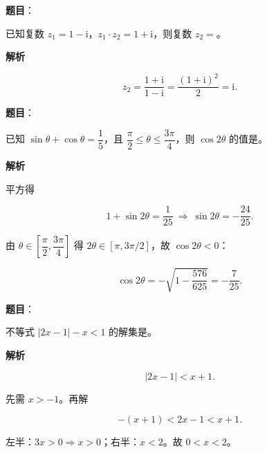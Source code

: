 \begin{answer}

\textbf{题目}：

已知复数 $z_1=1-\mathrm i$，$z_1\cdot z_2=1+\mathrm i$，则复数 $z_2=$\gkblank{}。

\textbf{解析}

\nopagebreak[4]
\[z_2=\frac{1+\mathrm i}{1-\mathrm i}=\frac{(1+\mathrm i)^2}{2}=\mathrm i.\]


\end{answer}
\begin{answer}

\textbf{题目}：

已知 $\sin\theta+\cos\theta=\dfrac15$，且 $\dfrac{\pi}{2}\leqslant\theta\leqslant\dfrac{3\pi}{4}$，则 $\cos2\theta$ 的值是\gkblank{}。

\textbf{解析}

平方得

\nopagebreak[4]
\[1+\sin2\theta=\frac1{25}\ \Rightarrow\ \sin2\theta=-\frac{24}{25}.\]

由 $\theta\in\left[\dfrac{\pi}{2},\dfrac{3\pi}{4}\right]$ 得 $2\theta\in[\pi,3\pi/2]$，故 $\cos2\theta<0$：

\nopagebreak[4]
\[\cos2\theta=-\sqrt{1-\frac{576}{625}}=-\frac7{25}.\]


\end{answer}
\begin{answer}

\textbf{题目}：

不等式 $|2x-1|-x<1$ 的解集是\gkblank{}。

\textbf{解析}

\nopagebreak[4]
\[|2x-1|<x+1.\]

先需 $x>-1$。再解

\nopagebreak[4]
\[-(x+1)<2x-1<x+1.\]

左半：$3x>0\Rightarrow x>0$；右半：$x<2$。故 $0<x<2$。


\end{answer}
